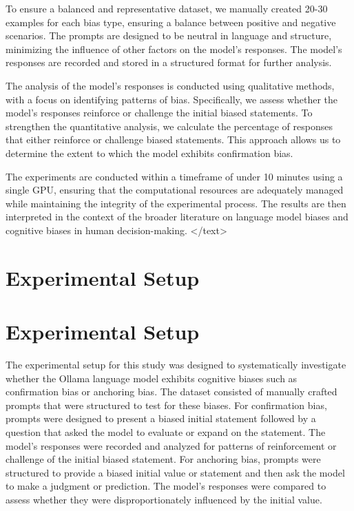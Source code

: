 \documentclass{article}
\begin{document}
To ensure a balanced and representative dataset, we manually created 20-30 examples for each bias type, ensuring a balance between positive and negative scenarios. The prompts are designed to be neutral in language and structure, minimizing the influence of other factors on the model's responses. The model's responses are recorded and stored in a structured format for further analysis.

The analysis of the model's responses is conducted using qualitative methods, with a focus on identifying patterns of bias. Specifically, we assess whether the model's responses reinforce or challenge the initial biased statements. To strengthen the quantitative analysis, we calculate the percentage of responses that either reinforce or challenge biased statements. This approach allows us to determine the extent to which the model exhibits confirmation bias.

The experiments are conducted within a timeframe of under 10 minutes using a single GPU, ensuring that the computational resources are adequately managed while maintaining the integrity of the experimental process. The results are then interpreted in the context of the broader literature on language model biases and cognitive biases in human decision-making.
</text>
\section{Experimental Setup}
\section{Experimental Setup}

The experimental setup for this study was designed to systematically investigate whether the Ollama language model exhibits cognitive biases such as confirmation bias or anchoring bias. The dataset consisted of manually crafted prompts that were structured to test for these biases. For confirmation bias, prompts were designed to present a biased initial statement followed by a question that asked the model to evaluate or expand on the statement. The model's responses were recorded and analyzed for patterns of reinforcement or challenge of the initial biased statement. For anchoring bias, prompts were structured to provide a biased initial value or statement and then ask the model to make a judgment or prediction. The model's responses were compared to assess whether they were disproportionately influenced by the initial value.
\end{document}
